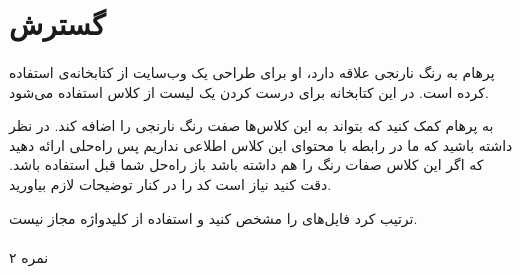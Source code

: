 \documentclass[../main.tex]{subfiles}
\begin{document}
\section{گسترش }

\paragraph{}
پرهام به رنگ نارنجی علاقه دارد، او برای طراحی یک وب‌سایت از کتابخانه‌ی
استفاده کرده است. در این کتابخانه برای درست کردن
یک لیست از کلاس 
استفاده می‌شود.

به پرهام کمک کنید که بتواند به این کلاس‌ها صفت رنگ نارنجی را اضافه کند.
در نظر داشته باشید که ما در رابطه با محتوای این کلاس اطلاعی نداریم
پس راه‌حلی ارائه دهید که اگر این کلاس صفات رنگ را هم داشته باشد باز راه‌حل شما قبل استفاده باشد.
دقت کنید نیاز است کد  را در کنار توضیحات لازم بیاورید.

ترتیب  کرد فایل‌های  را مشخص کنید
و استفاده از کلیدواژه  مجاز نیست.

\paragraph{}
۲ نمره
\end{document}

